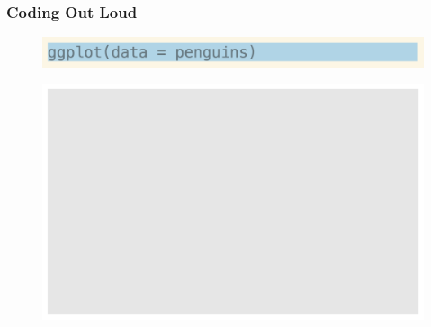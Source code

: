 \documentclass[11pt]{beamer}
\begin{document}
	\begin{frame}

		\frametitle{\textbf{Coding Out Loud}}

			\begin{minipage}[t]{0.5\linewidth}
	\begin{figure}
	\centering
	\includegraphics[width=1\linewidth]{Images/S2/code/s6}
	
\end{figure}
\end{minipage}%
\begin{minipage}[t]{0.5\linewidth}

	\begin{figure}
		\centering
		\includegraphics[width=1\linewidth]{Images/S2/penguins-0-1}
		
	\end{figure}
	
	
\end{minipage}
		
	\end{frame}
	
\end{document}
